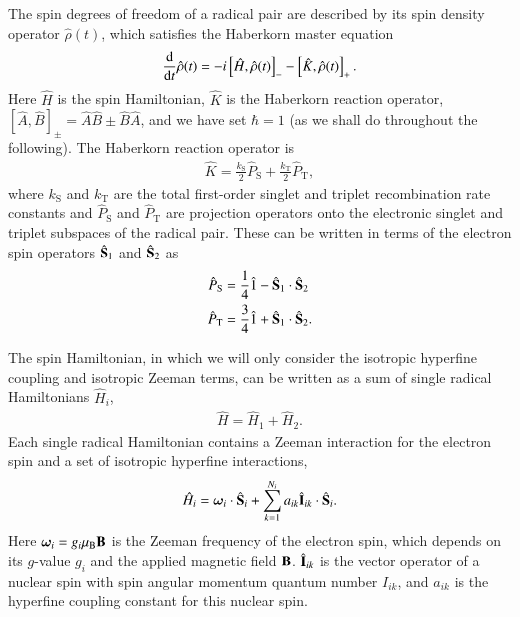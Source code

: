 \documentclass[%
aip,
jcp,%
amsmath,amssymb,
reprint%
]{revtex4-1}
\newcommand{\sing}{\ensuremath{\mathrm{S}}}
\newcommand{\trip}{\ensuremath{\mathrm{T}}}
\renewcommand{\op}[1]{\ensuremath{\hat{#1}}}
\begin{document}
The spin degrees of freedom of a radical pair are described by its spin density operator $\op{\rho}(t)$, which satisfies the Haberkorn master equation\cite{Haberkorn1976,Ivanov2010,Fay2018}
\begin{align}\label{haberkorn-qme-eq}
	\dv{t}\op{\rho}(t) = -i \left[\op{H},\op{\rho}(t)\right]_- - \left[\op{K},\op{\rho}(t)\right]_+. 
\end{align}
Here $\op{H}$ is the spin Hamiltonian, $\op{K}$ is the Haberkorn reaction operator, $[\op{A},\op{B}]_\pm = \op{A}\op{B}\pm\op{B}\op{A}$, and we have set $\hbar=1$ (as we shall do throughout the following). The Haberkorn reaction operator is 
\begin{align}
	\op{K} = \frac{k_\sing}{2}\op{P}_\sing + \frac{k_\trip}{2}\op{P}_\trip,
\end{align}
where $k_\sing$ and $k_\trip$  are the total first-order singlet and triplet recombination rate constants and $\op{P}_\sing$ and $\op{P}_\trip$ are projection operators onto the electronic singlet and triplet subspaces of the radical pair. These can be written in terms of the electron spin operators $\op{\vb{S}}_1$ and $\op{\vb{S}}_2$ as
\begin{subequations}
	\begin{align}
		\op{P}_\sing &= \frac{1}{4}\op{1} - \op{\vb{S}}_1\cdot \op{\vb{S}}_2 \\
		\op{P}_\trip &= \frac{3}{4}\op{1} + \op{\vb{S}}_1\cdot \op{\vb{S}}_2.
	\end{align}
\end{subequations}

The spin Hamiltonian, in which we will only consider the isotropic hyperfine coupling and isotropic Zeeman terms, can be written as a sum of single radical Hamiltonians $\op{H}_i$,\cite{Steiner1989}
\begin{align}
	\op{H} = \op{H}_1 + \op{H}_2.
\end{align}
Each single radical Hamiltonian contains a Zeeman interaction for the electron spin and a set of isotropic hyperfine interactions,\cite{Steiner1989}
\begin{align}
	\op{H}_i = \boldsymbol{\omega}_i \cdot \op{\vb{S}}_i + \sum_{k=1}^{N_i}a_{ik}\op{\vb{I}}_{ik}\cdot\op{\vb{S}}_{i}.
\end{align}
Here $\boldsymbol{\omega}_i = g_i \mu_\mathrm{B} \vb{B}$ is the Zeeman frequency of the electron spin, which depends on its $g$-value $g_i$ and the applied magnetic field $\vb{B}$. $\op{\vb{I}}_{ik}$ is the vector operator of a nuclear spin with spin angular momentum quantum number $I_{ik}$, and $a_{ik}$ is the hyperfine coupling constant for this nuclear spin. 
\end{document}
